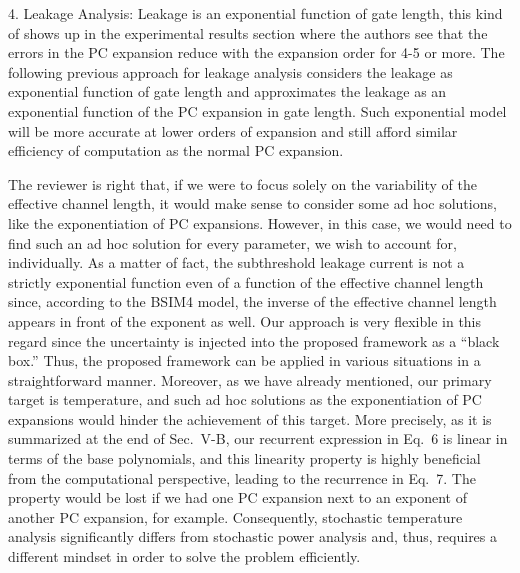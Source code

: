 \begin{reviewer}
4. Leakage Analysis: Leakage is an exponential function of gate length, this kind of shows up in the experimental results section where the authors see that the errors in the PC expansion reduce with the expansion order for 4-5 or more. The following previous approach for leakage analysis considers the leakage as exponential function of gate length and approximates the leakage as an exponential function of the PC expansion in gate length. Such exponential model will be more accurate at lower orders of expansion and still afford similar efficiency of computation as the normal PC expansion.
\end{reviewer}
\begin{authors}
The reviewer is right that, if we were to focus solely on the variability of the effective channel length, it would make sense to consider some ad hoc solutions, like the exponentiation of PC expansions.
However, in this case, we would need to find such an ad hoc solution for every parameter, we wish to account for, individually.
As a matter of fact, the subthreshold leakage current is not a strictly exponential function even of a function of the effective channel length since, according to the BSIM4 model, the inverse of the effective channel length appears in front of the exponent as well.
Our approach is very flexible in this regard since the uncertainty is injected into the proposed framework as a ``black box.''
Thus, the proposed framework can be applied in various situations in a straightforward manner.
Moreover, as we have already mentioned, our primary target is temperature, and such ad hoc solutions as the exponentiation of PC expansions would hinder the achievement of this target.
More precisely, as it is summarized at the end of Sec.~V-B, our recurrent expression in Eq.~6 is linear in terms of the base polynomials, and this linearity property is highly beneficial from the computational perspective, leading to the recurrence in Eq.~7.
The property would be lost if we had one PC expansion next to an exponent of another PC expansion, for example.
Consequently, stochastic temperature analysis significantly differs from stochastic power analysis and, thus, requires a different mindset in order to solve the problem efficiently.

\end{authors}

